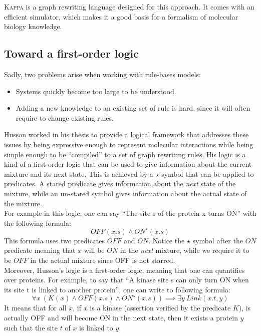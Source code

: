 \documentclass[10pt,a4paper]{article}
\newcommand\Kappa{\textsc{Kappa}}
\begin{document}
\Kappa{}\cite{kappa} is a graph rewriting language designed for this approach. It comes with an efficient simulator, which makes it a good basis for a formalism of molecular biology knowledge.

\subsection{Toward a first-order logic}
 Sadly, two problems arise when working with rule-bases models:
\begin{itemize}
\item Systems quickly become too large to be understood.
\item Adding a new knowledge to an existing set of rule is hard, since it will often require to change existing rules.
\end{itemize}

Husson worked in his thesis\cite{husson} to provide a logical framework that addresses these
issues by being expressive enough to represent molecular interactions while being simple enough to be ``compiled'' to a set of graph rewriting rules. His logic is a kind of a first-order logic that can be used to give information about the current mixture and its next state. This is achieved by a $\star$ symbol that can be applied to predicates. A stared predicate gives information about the \emph{next} state of the mixture, while an un-stared symbol gives information about the actual state of the mixture.\\

For example in this logic, one can say ``The site s of the protein x turns ON'' with the following formula:
$$ OFF(x.s) \land ON^\star(x.s) $$
This formula uses two predicates $OFF$ and $ON$. Notice the $\star$ symbol after the $ON$ predicate meaning that $x$ will be $ON$ in the \emph{next} mixture, while we require it to be $OFF$ in the actual mixture since OFF is not starred.\\

Moreover, Husson's logic is a first-order logic, meaning that one can quantifies over proteins. For example, to say that ``A kinase site s can only turn ON when its site t is linked to another protein'', one can write to following formula:
$$ \forall x\ (K(x) \land OFF(x.s) \land ON^\star(x.s)) \implies \exists y\ Link(x.t,y) $$
It means that for all $x$, if $x$ is a kinase (assertion verified by the predicate $K$), is actually OFF and will become ON in the next state, then it exists a protein $y$ such that the site $t$ of $x$ is linked to $y$.\\
\end{document}
